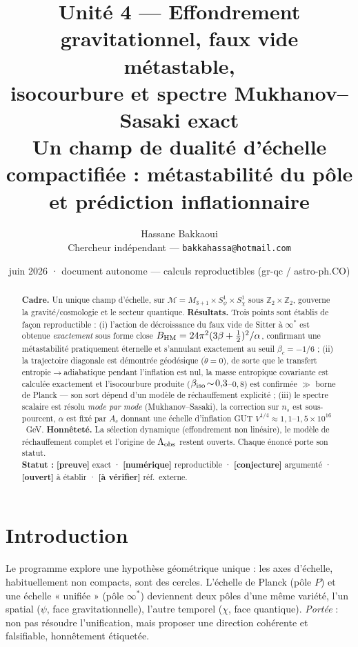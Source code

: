 \documentclass[11pt,a4paper]{article}
\title{\vspace{-1.2cm}\textbf{Unité 4 — Effondrement gravitationnel, faux vide métastable,\\ isocourbure et spectre Mukhanov–Sasaki exact}\\[4pt]
\large Un champ de dualité d'échelle compactifiée : métastabilité du pôle et prédiction inflationnaire}
\author{Hassane Bakkaoui\\ \small Chercheur indépendant — \texttt{bakkahassa@hotmail.com}}
\date{\small juin 2026 · document autonome — calculs reproductibles (gr-qc / astro-ph.CO)}
\newcommand{\st}[1]{\textbf{\textcolor{blue!45!black}{[#1]}}}
\newcommand{\fpole}{\infty^*}
\begin{document}
\maketitle
\thispagestyle{fancy}

\begin{abstract}
\noindent\textbf{Cadre.} Un unique champ d'échelle, sur $\mathcal{M}=M_{3+1}\times S^1_\psi\times S^1_\chi$ sous $\mathbb{Z}_2\times\mathbb{Z}_2$, gouverne la gravité/cosmologie et le secteur quantique. \textbf{Résultats.} Trois points sont établis de façon reproductible : (i) l'action de décroissance du faux vide de Sitter à $\fpole$ est obtenue \emph{exactement} sous forme close $B_{\rm HM}=24\pi^2(3\beta+\tfrac12)^2/\alpha$, confirmant une métastabilité pratiquement éternelle et s'annulant exactement au seuil $\beta_c=-1/6$ ; (ii) la trajectoire diagonale est démontrée géodésique ($\dot\theta=0$), de sorte que le transfert entropie$\to$adiabatique pendant l'inflation est nul, la masse entropique covariante est calculée exactement et l'isocourbure produite ($\beta_{\rm iso}\!\sim\!0{,}3$–$0{,}8$) est confirmée $\gg$ borne de Planck — son sort dépend d'un modèle de réchauffement explicité ; (iii) le spectre scalaire est résolu \emph{mode par mode} (Mukhanov–Sasaki), la correction sur $n_s$ est sous-pourcent, $\alpha$ est fixé par $A_s$ donnant une échelle d'inflation GUT $V^{1/4}\!\approx\!1{,}1$–$1{,}5\times10^{16}$~GeV. \textbf{Honnêteté.} La sélection dynamique (effondrement non linéaire), le modèle de réchauffement complet et l'origine de $\Lambda_{\rm obs}$ restent ouverts. Chaque énoncé porte son statut.\\
\textbf{Statut :} \st{preuve} exact · \st{numérique} reproductible · \st{conjecture} argumenté · \st{ouvert} à établir · \st{à vérifier} réf.\ externe.
\end{abstract}

\section{Introduction}
Le programme explore une hypothèse géométrique unique : les axes d'échelle, habituellement non compacts, sont des cercles. L'échelle de Planck (pôle $P$) et une échelle « unifiée » (pôle $\fpole$) deviennent deux pôles d'une même variété, l'un spatial ($\psi$, face gravitationnelle), l'autre temporel ($\chi$, face quantique). \emph{Portée} : non pas résoudre l'unification, mais proposer une direction cohérente et falsifiable, honnêtement étiquetée.
\end{document}
